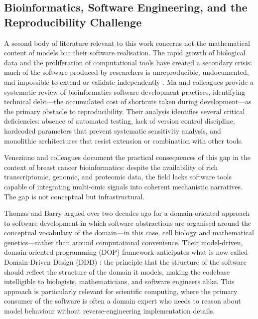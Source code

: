 \documentclass[12pt,a4paper]{article}
\begin{document}
\subsection{Bioinformatics, Software Engineering, and the
            Reproducibility Challenge}
\label{subsec:software}

A second body of literature relevant to this work concerns not the mathematical
content of models but their software realisation.
The rapid growth of biological data and the proliferation of computational tools have
created a secondary crisis: much of the software produced by researchers is
unreproducible, undocumented, and impossible to extend or validate independently
\cite{ma2024}.
Ma and colleagues \cite{ma2024} provide a systematic review of bioinformatics
software development practices, identifying technical debt---the accumulated cost
of shortcuts taken during development---as the primary obstacle to
reproducibility.
Their analysis identifies several critical deficiencies: absence of automated
testing, lack of version control discipline, hardcoded parameters that prevent
systematic sensitivity analysis, and monolithic architectures that resist
extension or combination with other tools.

Veneziano and colleagues \cite{veneziano2025} document the practical consequences
of this gap in the context of breast cancer bioinformatics: despite the
availability of rich transcriptomic, genomic, and proteomic data, the field
lacks software tools capable of integrating multi-omic signals into coherent
mechanistic narratives.
The gap is not conceptual but infrastructural.

Thomas and Barry \cite{thomas2003} argued over two decades ago for a
domain-oriented approach to software development in which software abstractions
are organised around the conceptual vocabulary of the domain---in this case,
cell biology and mathematical genetics---rather than around computational
convenience.
Their model-driven, domain-oriented programming (DOP) framework anticipates what
is now called Domain-Driven Design (DDD) \cite{thomas2003}: the principle that
the structure of the software should reflect the structure of the domain it models,
making the codebase intelligible to biologists, mathematicians, and software
engineers alike.
This approach is particularly relevant for scientific computing, where the primary
consumer of the software is often a domain expert who needs to reason about
model behaviour without reverse-engineering implementation details.
\end{document}
